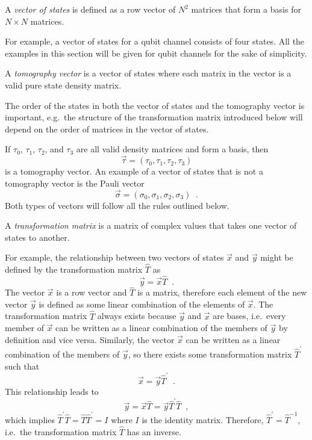 \begin{definition}
A {\em vector of states} is defined as a row vector of $N^2$ matrices that form a basis for $N\times N$ matrices.
\end{definition}
For example, a vector of states for a qubit channel consists of four states.  All the examples in this section will be given for qubit channels for the sake of simplicity.  
\begin{definition}
A {\em tomography vector} is a vector of states where each matrix in the vector is a valid pure state density matrix.
\end{definition}
The order of the states in both the vector of states and the tomography vector is important, e.g.\ the structure of the transformation matrix introduced below will depend on the order of matrices in the vector of states.

If $\tau_0$, $\tau_1$, $\tau_2$, and $\tau_3$ are all valid density matrices and form a basis, then
$$
\vec{\tau} = (\tau_0,\tau_1,\tau_2,\tau_3)
$$
is a tomography vector.  An example of a vector of states that is not a tomography vector is the Pauli vector
$$
\vec{\sigma} = (\sigma_0,\sigma_1,\sigma_2,\sigma_3)\;\;.
$$ 
Both types of vectors will follow all the rules outlined below.

\begin{definition}
A {\em transformation matrix} is a matrix of complex values that takes one vector of states to another.
\end{definition}
For example, the relationship between two vectors of states $\vec{x}$ and $\vec{y}$ might be defined by the transformation matrix $\hat{T}$ as
$$
\vec{y} = \vec{x}\hat{T}\;\;.
$$
The vector $\vec{x}$ is a row vector and $\hat{T}$ is a matrix, therefore each element of the new vector $\vec{y}$ is defined as some linear combination of the elements of $\vec{x}$.  The transformation matrix $\hat{T}$ always exists because $\vec{y}$ and $\vec{x}$ are bases, i.e.\ every member of $\vec{x}$ can be written as a linear combination of the members of $\vec{y}$ by definition and vice versa.  Similarly, the vector $\vec{x}$ can be written as a linear combination of the members of $\vec{y}$, so there exists some transformation matrix $\hat{T}^\prime$ such that
$$
\vec{x} = \vec{y}\hat{T}^\prime\;\;.
$$
This relationship leads to
$$
\vec{y} = \vec{x}\hat{T} = \vec{y}\hat{T}^\prime\hat{T}\;\;,
$$
which implies $\hat{T}^\prime\hat{T}=\hat{T}\hat{T}^\prime=I$ where $I$ is the identity matrix.  Therefore, $\hat{T}^\prime = \hat{T}^{-1}$, i.e.\ the transformation matrix $\hat{T}$ has an inverse.

